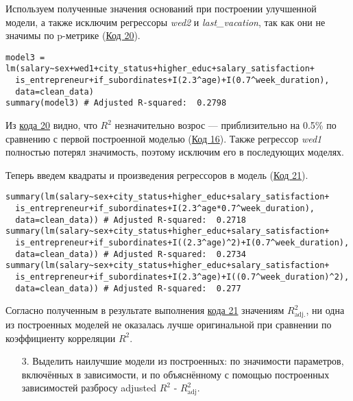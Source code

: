 Используем полученные значения оснований при построении улучшенной модели, а также исключим регрессоры \textit{wed2} и \textit{last\_vacation}, так как они не значимы по p-метрике (\hyperref[code:20]{Код 20}).

\begin{code}
\begin{verbatim}
model3 = lm(salary~sex+wed1+city_status+higher_educ+salary_satisfaction+
  is_entrepreneur+if_subordinates+I(2.3^age)+I(0.7^week_duration), 
  data=clean_data)
summary(model3) # Adjusted R-squared:  0.2798
\end{verbatim}
\label{code:20}
\end{code}

Из \hyperref[code:20]{кода 20} видно, что $R^{2}$ незначительно возрос --- приблизительно на 0.5\% по сравнению с первой построенной моделью (\hyperref[code:16]{Код 16}). Также регрессор \textit{wed1} полностью потерял значимость, поэтому исключим его в последующих моделях.

Теперь введем квадраты и произведения регрессоров в модель (\hyperref[code:21]{Код 21}).

\begin{code}
\begin{verbatim}
summary(lm(salary~sex+city_status+higher_educ+salary_satisfaction+
  is_entrepreneur+if_subordinates+I(2.3^age*0.7^week_duration),
  data=clean_data)) # Adjusted R-squared:  0.2718
summary(lm(salary~sex+city_status+higher_educ+salary_satisfaction+
  is_entrepreneur+if_subordinates+I((2.3^age)^2)+I(0.7^week_duration),
  data=clean_data)) # Adjusted R-squared:  0.2734
summary(lm(salary~sex+city_status+higher_educ+salary_satisfaction+
  is_entrepreneur+if_subordinates+I(2.3^age)+I((0.7^week_duration)^2),
  data=clean_data)) # Adjusted R-squared:  0.277
\end{verbatim}
\label{code:21}
\end{code}

Согласно полученным в результате выполнения \hyperref[code:21]{кода 21} значениям $R^{2}_{\text{adj.}}$, ни одна из построенных моделей не оказалась лучше оригинальной при сравнении по коэффициенту корреляции $R^2$.

\begin{enumerate}
    \item[3.] Выделить наилучшие модели из построенных: по значимости параметров, включённых в зависимости, и по объяснённому с помощью построенных зависимостей разбросу adjusted $R^2$ - $R^2_{\text{adj}}$.
\end{enumerate}

